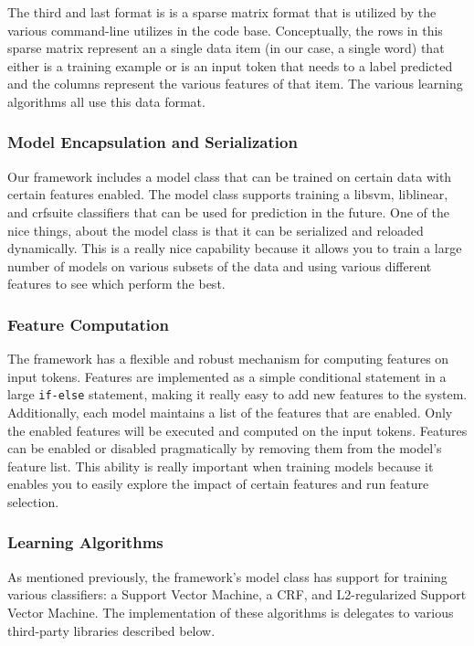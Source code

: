 \documentclass[preprint]{style}
\begin{document}
The third and last format is is a sparse matrix format that is utilized by the various command-line utilizes in the code base. Conceptually, the rows in this sparse matrix represent an a single data item (in our case, a single word) that either is a training example or is an input token that needs to a label predicted and the columns represent the various features of that item. The various learning algorithms all use this data format.

\subsubsection{Model Encapsulation and Serialization}

Our framework includes a model class that can be trained on certain data with certain features enabled. The model class supports training a libsvm, liblinear, and crfsuite classifiers that can be used for prediction in the future. One of the nice things, about the model class is that it can be serialized and reloaded dynamically. This is a really nice capability because it allows you to train a large number of models on various subsets of the data and using various different features to see which perform the best.

\subsubsection{Feature Computation}

The framework has a flexible and robust mechanism for computing features on input tokens. Features are implemented as a simple conditional statement in a large {\tt if-else} statement, making it really easy to add new features to the system. Additionally, each model maintains a list of the features that are enabled. Only the enabled features will be executed and computed on the input tokens. Features can be enabled or disabled pragmatically by removing them from the model's feature list. This ability is really important when training models because it enables you to easily explore the impact of certain features and run feature selection.

\subsubsection{Learning Algorithms}

As mentioned previously, the framework's model class has support for training various classifiers: a Support Vector Machine, a CRF, and L2-regularized Support Vector Machine. The implementation of these algorithms is delegates to various third-party libraries described below.
\end{document}
